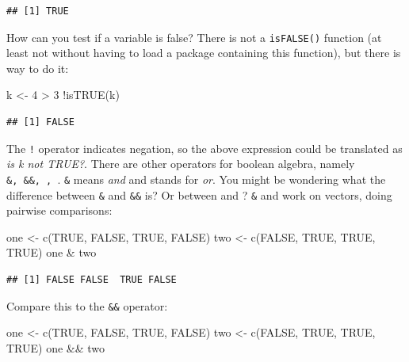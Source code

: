 \documentclass[
]{article}
\newenvironment{Shaded}{\begin{snugshade}}{\end{snugshade}}
\newcommand{\ConstantTok}[1]{\textcolor[rgb]{0.00,0.00,0.00}{#1}}
\newcommand{\DecValTok}[1]{\textcolor[rgb]{0.00,0.00,0.81}{#1}}
\newcommand{\FunctionTok}[1]{\textcolor[rgb]{0.00,0.00,0.00}{#1}}
\newcommand{\NormalTok}[1]{#1}
\newcommand{\OtherTok}[1]{\textcolor[rgb]{0.56,0.35,0.01}{#1}}
\newcommand{\SpecialCharTok}[1]{\textcolor[rgb]{0.00,0.00,0.00}{#1}}
\begin{document}
\begin{verbatim}
## [1] TRUE
\end{verbatim}

How can you test if a variable is false? There is not a \texttt{isFALSE()} function (at least not without having
to load a package containing this function), but there is way to do it:

\begin{Shaded}
\begin{Highlighting}[]
\NormalTok{k }\OtherTok{\textless{}{-}} \DecValTok{4} \SpecialCharTok{\textgreater{}} \DecValTok{3}
\SpecialCharTok{!}\FunctionTok{isTRUE}\NormalTok{(k)}
\end{Highlighting}
\end{Shaded}

\begin{verbatim}
## [1] FALSE
\end{verbatim}

The \texttt{!} operator indicates negation, so the above expression could be translated as \emph{is k not TRUE?}.
There are other operators for boolean algebra, namely \texttt{\&,\ \&\&,\ \textbar{},\ \textbar{}\textbar{}}. \texttt{\&} means \emph{and} and \texttt{\textbar{}} stands for \emph{or}.
You might be wondering what the difference between \texttt{\&} and \texttt{\&\&} is? Or between \texttt{\textbar{}} and \texttt{\textbar{}\textbar{}}? \texttt{\&} and
\texttt{\textbar{}} work on vectors, doing pairwise comparisons:

\begin{Shaded}
\begin{Highlighting}[]
\NormalTok{one }\OtherTok{\textless{}{-}} \FunctionTok{c}\NormalTok{(}\ConstantTok{TRUE}\NormalTok{, }\ConstantTok{FALSE}\NormalTok{, }\ConstantTok{TRUE}\NormalTok{, }\ConstantTok{FALSE}\NormalTok{)}
\NormalTok{two }\OtherTok{\textless{}{-}} \FunctionTok{c}\NormalTok{(}\ConstantTok{FALSE}\NormalTok{, }\ConstantTok{TRUE}\NormalTok{, }\ConstantTok{TRUE}\NormalTok{, }\ConstantTok{TRUE}\NormalTok{)}
\NormalTok{one }\SpecialCharTok{\&}\NormalTok{ two}
\end{Highlighting}
\end{Shaded}

\begin{verbatim}
## [1] FALSE FALSE  TRUE FALSE
\end{verbatim}

Compare this to the \texttt{\&\&} operator:

\begin{Shaded}
\begin{Highlighting}[]
\NormalTok{one }\OtherTok{\textless{}{-}} \FunctionTok{c}\NormalTok{(}\ConstantTok{TRUE}\NormalTok{, }\ConstantTok{FALSE}\NormalTok{, }\ConstantTok{TRUE}\NormalTok{, }\ConstantTok{FALSE}\NormalTok{)}
\NormalTok{two }\OtherTok{\textless{}{-}} \FunctionTok{c}\NormalTok{(}\ConstantTok{FALSE}\NormalTok{, }\ConstantTok{TRUE}\NormalTok{, }\ConstantTok{TRUE}\NormalTok{, }\ConstantTok{TRUE}\NormalTok{)}
\NormalTok{one }\SpecialCharTok{\&\&}\NormalTok{ two}
\end{Highlighting}
\end{Shaded}
\end{document}
